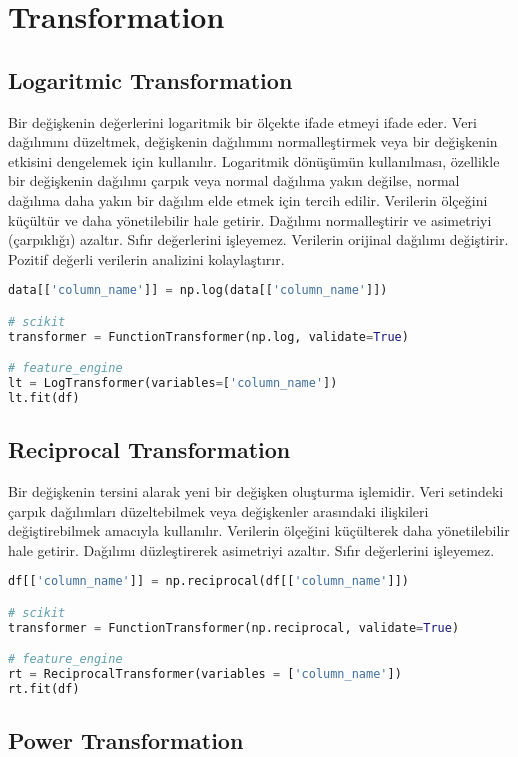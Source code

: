 \section{Transformation}

\subsection{Logaritmic Transformation}
Bir değişkenin değerlerini logaritmik bir ölçekte ifade etmeyi ifade eder. Veri dağılımını düzeltmek, değişkenin dağılımını normalleştirmek veya bir değişkenin etkisini dengelemek için kullanılır. Logaritmik dönüşümün kullanılması, özellikle bir değişkenin dağılımı çarpık veya normal dağılıma yakın değilse, normal dağılıma daha yakın bir dağılım elde etmek için tercih edilir. Verilerin ölçeğini küçültür ve daha yönetilebilir hale getirir. Dağılımı normalleştirir ve asimetriyi (çarpıklığı) azaltır. Sıfır değerlerini işleyemez. Verilerin orijinal dağılımı değiştirir. Pozitif değerli verilerin analizini kolaylaştırır.

\begin{lstlisting}[language=Python]
data[['column_name']] = np.log(data[['column_name']])

# scikit
transformer = FunctionTransformer(np.log, validate=True)

# feature_engine
lt = LogTransformer(variables=['column_name'])
lt.fit(df)
\end{lstlisting}

\subsection{Reciprocal Transformation}
Bir değişkenin tersini alarak yeni bir değişken oluşturma işlemidir. Veri setindeki çarpık dağılımları düzeltebilmek veya değişkenler arasındaki ilişkileri değiştirebilmek amacıyla kullanılır. Verilerin ölçeğini küçülterek daha yönetilebilir hale getirir. Dağılımı düzleştirerek asimetriyi azaltır. Sıfır değerlerini işleyemez.

\begin{lstlisting}[language=Python]
df[['column_name']] = np.reciprocal(df[['column_name']])

# scikit
transformer = FunctionTransformer(np.reciprocal, validate=True)

# feature_engine
rt = ReciprocalTransformer(variables = ['column_name'])
rt.fit(df)
\end{lstlisting}

\subsection{Power Transformation}


